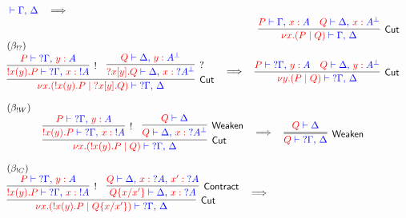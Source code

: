 \begin{figure*}
\[\begin{array}{c}
{{      \tpvdash \tp{\Gamma \comma \Delta}
  }
}
\quad \becomes \hfill
\\
\hfill
\vcenter{
  \inference{
    \tm{P} \tpvdash \tp{\Gamma \comma \tmof{x}A}
    &
    \tm{Q} \tpvdash \tp{\Delta \comma \tmof{x}\dualbt{A}}
  }{Cut}{
    \tm{\nu x \Of{A}.(P \mid Q)} \tpvdash \tp{\Gamma \comma \Delta}
  }
}
\\
\multicolumn{1}{l}{(\beta_{!?})} \\ %
\vcenter{
  \inference{
    \inference{
      \tm{P} \tpvdash \tp{{?\Gamma} \comma \tmof{y}A}
    }{!}{
      \tm{!x(y).P} \tpvdash \tp{{?\Gamma} \comma \tmof{x}{!A}}
    }
    &
    \inference{
      \tm{Q} \tpvdash \tp{\Delta \comma \tmof{y}\dualbt{A}}
    }{?}{
      \tm{?x[y].Q} \tpvdash \tp{\Delta \comma \tmof{x}{?\dualbt{A}}}
    }
  }{Cut}{
    \tm{\nu x \Of{!A}.(!x(y).P \mid {?x[y].Q})} \tpvdash
      \tp{{?\Gamma} \comma \Delta}
  }
}
\quad \becomes \quad
\vcenter{
  \inference{
    \tm{P} \tpvdash \tp{{?\Gamma} \comma \tmof{y}A}
    &
    \tm{Q} \tpvdash \tp{\Delta \comma \tmof{y}\dualbt{A}}
  }{Cut}{
    \tm{\nu y\Of{A}.(P \mid Q)} \tpvdash \tp{{?\Gamma} \comma \Delta}
  }
}
\\~\\
\multicolumn{1}{l}{(\beta_{!W})} \\ %
\vcenter{
  \inference{
    \inference{
      \tm{P} \tpvdash \tp{{?\Gamma} \comma \tmof{y}A}
    }{!}{
      \tm{!x(y).P} \tpvdash \tp{{?\Gamma} \comma \tmof{x}{!A}}
    }
    &
    \inference{
      \tm{Q} \tpvdash \tp{\Delta}
    }{Weaken}{
      \tm{Q} \tpvdash \tp{\Delta \comma \tmof{x}{?\dualbt{A}}}
    }
  }{Cut}{
    \tm{\nu x\Of{!A}.(!x(y).P \mid Q)} \tpvdash \tp{{?\Gamma} \comma \Delta}
  }
}
\quad \becomes \quad
\vcenter{
  \Inference{
    \tm{Q} \tpvdash \tp{\Delta}
  }{Weaken}{
    \tm{Q} \tpvdash \tp{{?\Gamma} \comma \Delta}
  }
}
\\~\\
\multicolumn{1}{l}{(\beta_{!C})} \\ %
\vcenter{
  \inference{
    \inference{
      \tm{P} \tpvdash \tp{{?\Gamma} \comma \tmof{y}A}
    }{!}{
      \tm{!x(y).P} \tpvdash \tp{{?\Gamma} \comma \tmof{x}{!A}}
    }
    &
    \inference{
      \tm{Q} \tpvdash \tp{\Delta \comma \tmof{x}{?A} \comma \tmof{x'}{?A}}
    }{Contract}{
      \tm{Q\sub{x/x'}} \tpvdash \tp{\Delta \comma \tmof{x}{?A}}
    }
  }{Cut}{
    \tm{\nu x\Of{!A}.(!x(y).P \mid Q\sub{x/x'})} \tpvdash
      \tp{{?\Gamma} \comma \Delta}
  }
} \quad \becomes \hfill
\\

\end{array}\]
\end{figure*}
